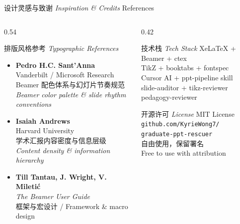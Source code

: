 \documentclass[aspectratio=169,10pt]{beamer}
\newcommand{\EN}[1]{\textit{#1}}
\newcommand{\sectag}[1]{\textmd{\small\normalfont\textcolor{deepblue!60}{#1}}}
\begin{document}
\begin{frame}{设计灵感与致谢 \EN{Inspiration \& Credits} \sectag{References}}
  \begin{columns}[T]
    \begin{column}{0.54\textwidth}
      \begin{block}{\small 排版风格参考 \EN{Typographic References}}
        \footnotesize
        \begin{itemize}
          \item \textbf{Pedro H.C. Sant'Anna}\\
            Vanderbilt / Microsoft Research\\
            {\tiny Beamer 配色体系与幻灯片节奏规范}\\
            {\tiny \textit{Beamer color palette \& slide rhythm conventions}}
          \vspace{2pt}
          \item \textbf{Isaiah Andrews}\\
            Harvard University\\
            {\tiny 学术汇报内容密度与信息层级}\\
            {\tiny \textit{Content density \& information hierarchy}}
          \vspace{2pt}
          \item \textbf{Till Tantau, J. Wright, V. Miletić}\\
            {\tiny \textit{The Beamer User Guide}}\\
            {\tiny 框架与宏设计 / Framework \& macro design}
        \end{itemize}
      \end{block}
    \end{column}
    \begin{column}{0.42\textwidth}
      \begin{exampleblock}{\small 技术栈 \EN{Tech Stack}}
        \footnotesize
        XeLaTeX + Beamer + ctex\\
        TikZ + booktabs + fontspec\\
        Cursor AI + ppt-pipeline skill\\
        slide-auditor + tikz-reviewer\\
        pedagogy-reviewer
      \end{exampleblock}
      \vspace{4pt}
      \begin{alertblock}{\small 开源许可 \EN{License}}
        \footnotesize
        MIT License\\
        \texttt{github.com/KyrieWong7/}\\
        \texttt{graduate-ppt-rescuer}\\[2pt]
        自由使用，保留署名\\
        Free to use with attribution
      \end{alertblock}
    \end{column}
  \end{columns}
\end{frame}
\end{document}
